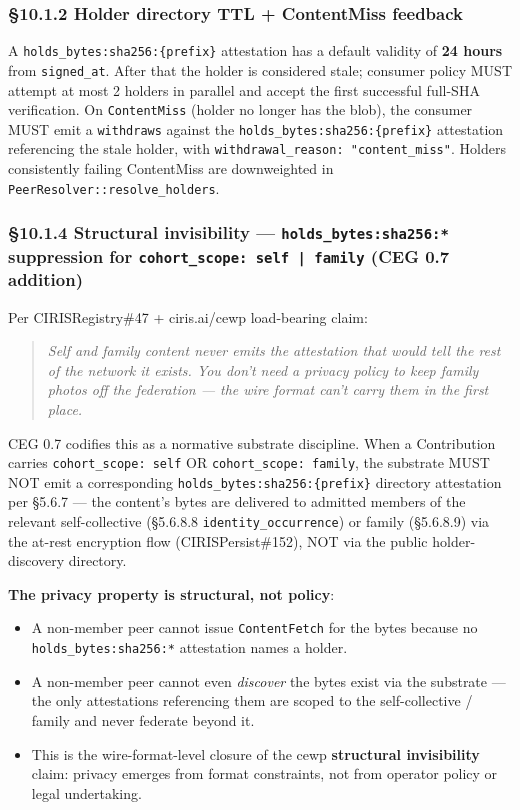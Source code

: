 \documentclass[11pt]{article}
\begin{document}
\subsubsection*{§10.1.2 Holder directory TTL + ContentMiss feedback}


A \texttt{holds\_bytes:sha256:\{prefix\}} attestation has a default validity of \textbf{24 hours} from \texttt{signed\_at}. After that the holder is considered stale; consumer policy MUST attempt at most 2 holders in parallel and accept the first successful full-SHA verification. On \texttt{ContentMiss} (holder no longer has the blob), the consumer MUST emit a \texttt{withdraws} against the \texttt{holds\_bytes:sha256:\{prefix\}} attestation referencing the stale holder, with \texttt{withdrawal\_reason: "content\_miss"}. Holders consistently failing ContentMiss are downweighted in \texttt{PeerResolver::resolve\_holders}.


\subsubsection*{§10.1.4 Structural invisibility — \texttt{holds\_bytes:sha256:*} suppression for \texttt{cohort\_scope: self | family} (CEG 0.7 addition)}


Per CIRISRegistry\#47 + ciris.ai/cewp load-bearing claim:


\begin{quote}\itshape Self and family content never emits the attestation that would tell the rest of the network it exists. You don't need a privacy policy to keep family photos off the federation — the wire format can't carry them in the first place.\end{quote}


CEG 0.7 codifies this as a normative substrate discipline. When a Contribution carries \texttt{cohort\_scope: self} OR \texttt{cohort\_scope: family}, the substrate MUST NOT emit a corresponding \texttt{holds\_bytes:sha256:\{prefix\}} directory attestation per §5.6.7 — the content's bytes are delivered to admitted members of the relevant self-collective (§5.6.8.8 \texttt{identity\_occurrence}) or family (§5.6.8.9) via the at-rest encryption flow (CIRISPersist\#152), NOT via the public holder-discovery directory.


\textbf{The privacy property is structural, not policy}:


\begin{itemize}\setlength\itemsep{0pt}
\item A non-member peer cannot issue \texttt{ContentFetch} for the bytes because no \texttt{holds\_bytes:sha256:*} attestation names a holder.
\item A non-member peer cannot even \textit{discover} the bytes exist via the substrate — the only attestations referencing them are scoped to the self-collective / family and never federate beyond it.
\item This is the wire-format-level closure of the cewp \textbf{structural invisibility} claim: privacy emerges from format constraints, not from operator policy or legal undertaking.
\end{itemize}
\end{document}
